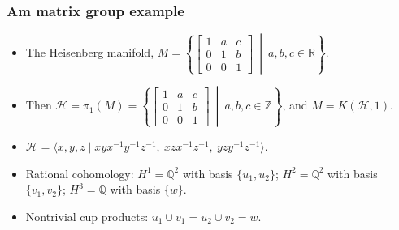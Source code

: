 \documentclass[dvipsnames]{beamer}
\theoremstyle{example}
\newcommand{\R}{\mathbb{R}}
\newcommand{\Q}{\mathbb{Q}}
\newcommand{\Z}{\mathbb{Z}}
\begin{document}
\begin{frame}
\frametitle{Am matrix group example}
\begin{example}

\begin{itemize}
\item The Heisenberg manifold,  
$M=\left\{ 
\begin{bmatrix}
1 & a & c\\
0 & 1& b\\
0&0&1
\end{bmatrix} ~\middle| ~
a,b,c\in \R
\right\}.$\\

\vspace{0.2cm}

\item Then $\mathcal{H}=\pi_1(M)=\left\{ 
\begin{bmatrix}
1 & a & c\\
0 & 1& b\\
0&0&1
\end{bmatrix} ~\middle| ~
a,b,c\in \Z
\right\}$, and $M=K(\mathcal{H},1)$.\\
\vspace{0.2cm}

\pause

\item 
$\mathcal{H}=\langle x,y,z \mid xyx^{-1}y^{-1}z^{-1},~ xzx^{-1}z^{-1},~ yzy^{-1}z^{-1}\rangle$.\\
\vspace{0.2cm}

\pause
 
\item Rational cohomology: $H^1=\Q^2$ with basis $\{u_1, u_2\}$; $H^2=\Q^2$ with basis $\{v_1, v_2\}$; $H^3=\Q$ with basis $\{w\}$.\\
\vspace{0.2cm}
 
 
\item Nontrivial cup products: $u_1\cup v_1=u_2\cup v_2=w$.
\end{itemize}
\end{example}
\end{frame}
  
  
  
   
 
 
 
\end{document}
